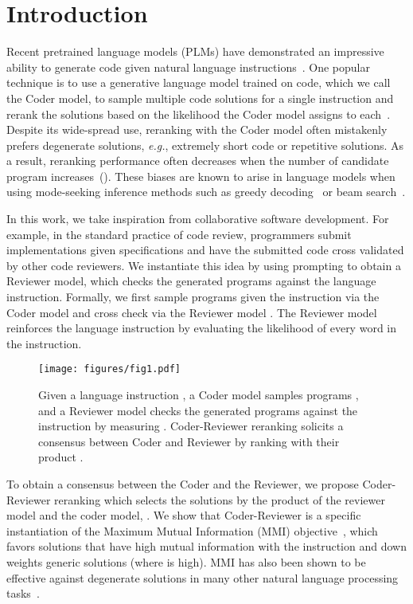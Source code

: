 \documentclass[nohyperref]{article}
\theoremstyle{plain}
\theoremstyle{definition}
\theoremstyle{remark}
\begin{document}
 \section{Introduction}
Recent pretrained language models (PLMs) have demonstrated an impressive ability to generate code given natural language instructions~\citep{codex, incoder, palm, codegen}.
One popular technique is to use a generative language model trained on code, which we call the Coder model, to sample multiple code solutions for a single instruction and rerank the solutions based on the likelihood the Coder model assigns to each~\cite{codex}.
Despite its wide-spread use, reranking with the Coder model often mistakenly prefers degenerate solutions, \emph{e.g.}, extremely short code or repetitive solutions.
As a result, reranking performance often decreases when the number of candidate program increases~().
These biases are known to arise in language models when using mode-seeking inference methods such as greedy decoding~\citep{curious-case} or beam search~\citep{mmi-diversity,stahlberg2019nmt}.

In this work, we take inspiration from collaborative software development.
For example, in the standard practice of code review, programmers submit implementations given specifications and have the submitted code cross validated by other code reviewers.
We instantiate this idea by using prompting to obtain a Reviewer model, which checks the generated programs against the language instruction. 
Formally, we first sample programs  given the instruction  via the Coder model  and cross check via the Reviewer model .
The Reviewer model reinforces the language instruction by evaluating the likelihood of every word in the instruction.
\begin{figure}
    \centering
    \texttt{[image: figures/fig1.pdf]}
    \caption{Given a language instruction , a Coder model samples programs , and a Reviewer model checks the generated programs against the instruction by measuring . Coder-Reviewer reranking solicits a consensus between Coder and Reviewer by ranking with their product .}
    \label{fig:teaser}
    \vspace{-15pt}
\end{figure}


To obtain a consensus between the Coder and the Reviewer, we propose Coder-Reviewer reranking which selects the solutions by the product of the reviewer model and the coder model, .
We show that Coder-Reviewer is a specific instantiation of the Maximum Mutual Information (MMI) objective~\citep{mmi-diversity}, which favors solutions that have high mutual information with the instruction and down weights generic solutions (where  is high).
MMI has also been shown to be effective against degenerate solutions in many other natural language processing tasks~\citep{rerank-parsing,generative-qa, pragmatic-inference}.
\end{document}
